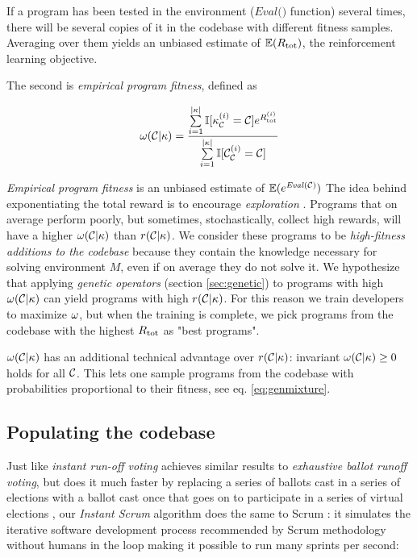 If a program has been tested in the environment ($\textit{Eval()}$ function) several times, there will be several copies of it in the codebase with different fitness samples.
Averaging over them yields an unbiased estimate of $\mathbb{E}(R_\text{tot})$, the reinforcement learning objective.

The second is \emph{empirical program fitness}, defined as

\begin{equation}
    \omega(\mathcal{C}|\kappa) = \frac{\sum\limits_{i=1}^{|\kappa|} \mathbb{I}[\kappa_{\mathcal{C}}^{(i)}=\mathcal{C}] e^{R_\text{tot}^{(i)}}}{\sum\limits_{i=1}^{|\kappa|} \mathbb{I}[\mathcal{C}_{\mathcal{C}}^{(i)}=\mathcal{C}]}
    \label{eq:empfitness}
\end{equation}

\emph{Empirical program fitness} is an unbiased estimate of $\mathbb{E}(e^{\mathit{Eval}(\mathcal{C})})$
The idea behind exponentiating the total reward is to encourage \emph{exploration} \cite{exploration}.
Programs that on average perform poorly, but sometimes, stochastically, collect high rewards, will have a higher $\omega(\mathcal{C}|\kappa)$ than $r(\mathcal{C}|\kappa)$.
We consider these programs to be \emph{high-fitness additions to the codebase} because they contain the knowledge necessary for solving environment $M$, even if on average they do not solve it.
We hypothesize that applying \emph{genetic operators} (section \ref{sec:genetic}) to programs with high $\omega(\mathcal{C}|\kappa)$ can yield programs with high $r(\mathcal{C}|\kappa)$.
For this reason we train developers to maximize $\omega$, but when the training is complete, we pick programs from the codebase with the highest $R_\text{tot}$ as "best programs".
 
$\omega(\mathcal{C}|\kappa)$ has an additional technical advantage over $r(\mathcal{C}|\kappa)$: invariant $\omega(\mathcal{C}|\kappa) \geq 0$ holds for all $\mathcal{C}$.
This lets one sample programs from the codebase with probabilities proportional to their fitness, see eq. \ref{eq:genmixture}.

\newpage \subsection{Populating the codebase}

Just like \emph{instant run-off voting} achieves similar results to \emph{exhaustive ballot runoff voting}, but does it much faster by replacing a series of ballots cast in a series of elections with a ballot cast once that goes on to participate in a series of virtual elections \cite{votingsystems}, our \emph{Instant Scrum} algorithm does the same to Scrum \cite{scrum}: it simulates the iterative software development process recommended by Scrum methodology without humans in the loop making it possible to run many sprints per second:


